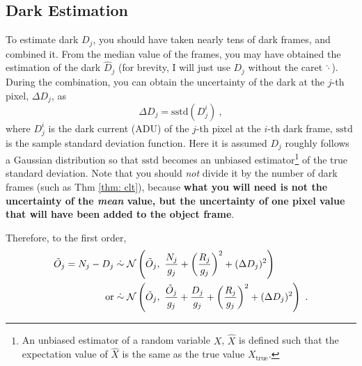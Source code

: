 \subsection{Dark Estimation}
To estimate dark $ D_j $, you should have taken nearly tens of dark frames, and combined it. From the median value of the frames, you may have obtained the estimation of the dark $ \hat{D}_j $ (for brevity, I will just use $ D_j $ without the caret $ \hat{\cdot} $). During the combination, you can obtain the uncertainty of the dark at the $ j $-th pixel, $ \Delta D_j $, as
\begin{equation}
   \Delta D_j = \mathrm{sstd} (D_j^{i}) ~,
\end{equation}
where $ D_j^{i} $ is the dark current (ADU) of the $ j $-th pixel at the $ i $-th dark frame, $ \mathrm{sstd} $ is the sample standard deviation function. Here it is assumed $ D_j $ roughly follows a Gaussian distribution so that $ \mathrm{sstd} $ becomes an unbiased estimator\footnote{An unbiased estimator of a random variable $ X $, $ \hat{X} $ is defined such that the expectation value of $ \hat{X} $ is the same as the true value $ X_\mathrm{true} $.} of the true standard deviation. Note that you should \emph{not} divide it by the number of dark frames (such as Thm \ref{thm: clt}), because \textbf{what you will need is not the uncertainty of the \emph{mean} value, but the uncertainty of one pixel value that will have been added to the object frame}. 

Therefore, to the first order,
\begin{equation}
\begin{aligned}
  \tilde{O}_j = N_j - D_j 
    &\mathrel{\dot{\sim}} \mathcal{N} 
      \left ( \tilde{O}_j,~ 
        \frac{N_j}{g_j} + \left (\frac{R_j}{g_j} \right )^2 + (\Delta D_j)^2 \right ) \\
  \mathrm{or}
    &\mathrel{\dot{\sim}} \mathcal{N} 
        \left ( \tilde{O}_j,~ 
          \frac{\tilde{O}_j}{g_j} 
          + \frac{D_j}{g_j} 
          + \left (\frac{R_j}{g_j} \right )^2 
          + (\Delta D_j)^2 \right ) ~.
\end{aligned}
\end{equation}

